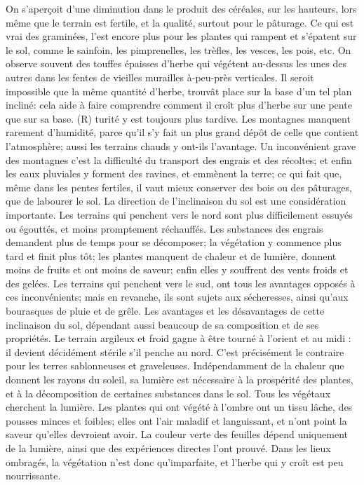 On s'aperçoit d'une diminution dans le produit des céréales, sur les hauteurs, lors même que le terrain est fertile, et la qualité, surtout pour le pâturage. Ce qui est vrai des graminées, l'est encore plus pour les plantes qui rampent et s'épatent sur le sol, comme le sainfoin, les pimprenelles, les trèfles, les vesces, les pois, etc. On observe souvent des touffes épaisses d'herbe qui végétent au-dessus les unes des autres dans les fentes de vieilles murailles à-peu-près verticales. Il seroit impossible que la même quantité d'herbe, trouvât place sur la base d'un tel plan incliné: cela aide à faire comprendre comment il croît plus d'herbe sur une pente que sur sa base. (R)\setcounter{page}{190} turité y est toujours plus tardive. Les montagnes manquent rarement d'humidité, parce qu'il s'y fait un plus grand dépôt de celle que contient l'atmosphère; aussi les terrains chauds y ont-ils l'avantage. Un inconvénient grave des montagnes c'est la difficulté du transport des engrais et des récoltes; et enfin les eaux pluviales y forment des ravines, et emmènent la terre; ce qui fait que, même dans les pentes fertiles, il vaut mieux conserver des bois ou des pâturages, que de labourer le sol.
La direction de l'inclinaison du sol est une considération importante. Les terrains qui penchent vers le nord sont plus difficilement essuyés ou égouttés, et moins promptement réchauffés. Les substances des engrais demandent plus de temps pour se décomposer; la végétation y commence plus tard et finit plus tôt; les plantes manquent de chaleur et de lumière, donnent moins de fruits et ont moins de saveur; enfin elles y souffrent des vents froids et des gelées.
Les terrains qui penchent vers le sud, ont tous les avantages opposés à ces inconvénients; mais en revanche, ils sont sujets aux sécheresses, ainsi qu'aux bourasques de pluie et de grêle.
Les avantages et les désavantages de cette inclinaison du sol, dépendant aussi beaucoup\setcounter{page}{191} de sa composition et de ses propriétés. Le terrain argileux et froid gagne à être tourné à l'orient et au midi : il devient décidément stérile s'il penche au nord. C'est précisément le contraire pour les terres sablonneuses et graveleuses.
Indépendamment de la chaleur que donnent les rayons du soleil, sa lumière est nécessaire à la prospérité des plantes, et à la décomposition de certaines substances dans le sol. Tous les végétaux cherchent la lumière. Les plantes qui ont végété à l'ombre ont un tissu lâche, des pousses minces et foibles; elles ont l'air maladif et languissant, et n'ont point la saveur qu'elles devroient avoir. La couleur verte des feuilles dépend uniquement de la lumière, ainsi que des expériences directes l'ont prouvé. Dans les lieux ombragés, la végétation n'est donc qu'imparfaite, et l'herbe qui y croît est peu nourrissante.
